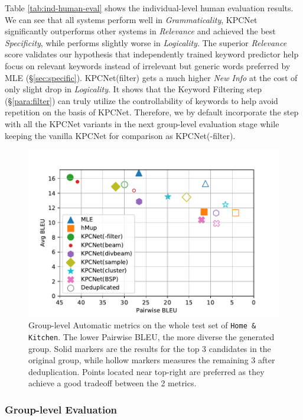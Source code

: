 Table \ref{tab:ind-human-eval} shows the individual-level human evaluation results. We can see that all systems perform well in \textit{Grammaticality}, 
KPCNet significantly outperforms other systems in \textit{Relevance} and 
achieved the best \textit{Specificity}, while performs slightly worse in \textit{Logicality}. The superior \textit{Relevance} score validates our hypothesis 
that independently trained keyword predictor help focus on relevant keywords 
instead of irrelevant but generic words preferred by MLE 
(\S \ref{sec:specific}). KPCNet(filter) gets a much higher 
\textit{New Info} at the cost of only slight drop in \textit{Logicality}. 
It shows that the Keyword Filtering step (\S \ref{para:filter}) can truly 
utilize the controllability of keywords to help avoid repetition on the 
basis of KPCNet. Therefore, we by default incorporate the step with 
all the KPCNet variants in the next group-level evaluation stage while 
keeping the vanilla KPCNet for comparison as KPCNet(-filter).

\begin{figure}[htbp]
  \centering
  \includegraphics[width=\linewidth]{tradeoff-2BLEU.pdf}
  \caption{Group-level Automatic metrics on the whole test set of \texttt{Home \& Kitchen}. The lower Pairwise BLEU, the more diverse the generated group. Solid markers are the results for the top 3 candidates in the original group, while hollow markers measures the remaining 3 after deduplication. Points located near top-right are preferred as they achieve a good tradeoff between the 2 metrics.}
  \label{fig:group-filter}
  \end{figure}

  

\subsubsection{Group-level Evaluation}




